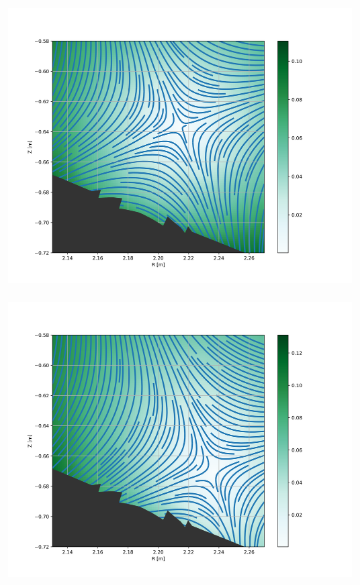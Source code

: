 \begin{figure}[H]\centering
	\begin{subfigure}[t]{0.43\textwidth}
		\centering
		\includegraphics[width=1\textwidth]{schemes/rippleStreamlines_phi1.png}
		\label{fig:ripple_Xpoint_phi1}
	\end{subfigure}
	\begin{subfigure}[t]{0.43\textwidth}
		\centering
		\includegraphics[width=1\textwidth]{schemes/rippleStreamlines_phi2.png}
		\label{fig:ripple_Xpoint_phi2}
	\end{subfigure}
	\begin{subfigure}[t]{0.43\textwidth}

\end{subfigure}
\end{figure}
